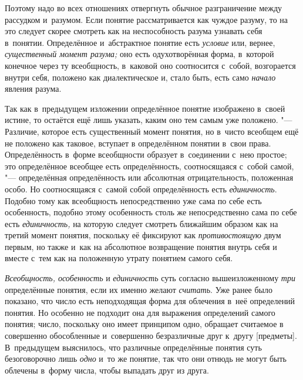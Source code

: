 Поэтому надо во всех отношениях отвергнуть обычное
разграничение между рассудком и~разумом. Если понятие рассматривается как
чуждое разуму, то на это следует скорее смотреть как на неспособность
разума узнавать себя в~понятии. Определённое и~абстрактное понятие есть
{\em условие} или, вернее, {\em существенный момент
разума;} оно есть одухотворённая форма, в~которой конечное
через ту всеобщность, в~каковой оно соотносится с~собой, возгорается внутри
себя, положено как диалектическое и, стало быть, есть само
{\em начало} явления разума.

Так как в~предыдущем изложении определённое понятие изображено
в~своей истине, то остаётся ещё лишь указать, каким оно тем самым уже
положено. "--- Различие, которое есть существенный момент
понятия, но в~чисто всеобщем ещё не положено как таковое, вступает в
определённом понятии в~свои права. Определённость в~форме всеобщности
образует в~соединении с~нею простое; это определённое
всеобщее есть определённость, соотносящаяся с~собой самой, "---
определённая определённость или абсолютная отрицательность,
положенная особо. Но соотносящаяся с~самой собой определённость есть
{\em единичность}.
Подобно тому как всеобщность непосредственно уже сама по себе
есть особенность, подобно этому особенность столь же непосредственно сама
по себе есть {\em единичность,}
на которую следует смотреть ближайшим образом как на третий
момент понятия, поскольку её фиксируют как {\em противостоящую} двум
первым, но также и~как на абсолютное возвращение понятия внутрь себя и
вместе с~тем как на положенную утрату понятием самого себя.


{\em Всеобщность, особенность} и {\em единичность} суть согласно
вышеизложенному {\em три} определённые понятия, если их именно желают
{\em считать}. Уже ранее было показано, что число есть неподходящая форма для
облечения в~неё определений понятия. Но особенно не подходит она для выражения определений самого
понятия; число, поскольку оно имеет принципом одно, обращает считаемое в
совершенно обособленные и~совершенно безразличные друг к~другу [предметы].
В~предыдущем выяснилось, что различные определённые понятия суть безоговорочно
лишь {\em одно} и~то же понятие, так что они отнюдь не могут быть облечены
в~форму числа, чтобы выпадать друг из друга.

